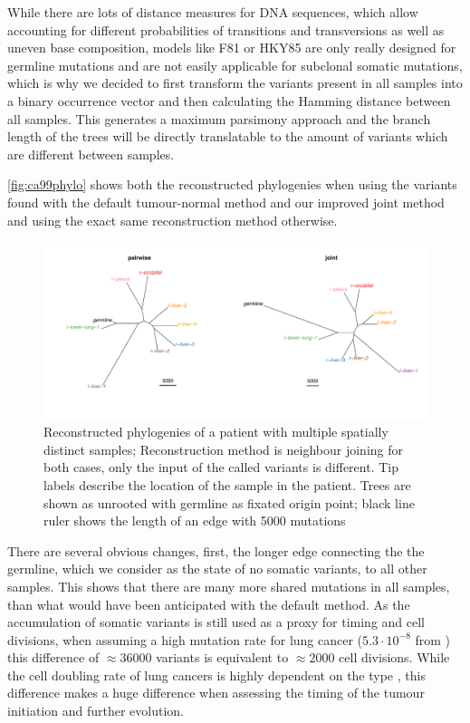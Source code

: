 While there are lots of distance measures for DNA sequences, which allow accounting for different probabilities of transitions and transversions as well as uneven base composition, models like F81 \cite{Felsenstein1981} or HKY85 \cite{Hasegawa1985} are only really designed for germline mutations and are not easily applicable for subclonal somatic mutations, which is why we decided to first transform the variants present in all samples into a binary occurrence vector and then calculating the Hamming distance \cite{Hamming1950} between all samples. This generates a maximum parsimony approach and the branch length of the trees will be directly translatable to the amount of variants which are different between samples. 

\autoref{fig:ca99phylo} shows both the reconstructed phylogenies when using the variants found with the default tumour-normal method and our improved joint method and using the exact same reconstruction method otherwise.

\begin{figure}[!ht]
\centering
\includegraphics[width=.99\linewidth]{Figures/phyloCA99.pdf}
\caption[Reconstructed phylogenies of joint samples]{Reconstructed phylogenies of a patient with multiple spatially distinct samples; Reconstruction method is neighbour joining for both cases, only the input of the called variants is different. Tip labels describe the location of the sample in the patient. Trees are shown as unrooted with germline as fixated origin point; black line ruler shows the length of an edge with 5000 mutations}\label{fig:ca99phylo}
\end{figure}

There are several obvious changes, first, the longer edge connecting the the germline, which we consider as the state of no somatic variants, to all other samples. This shows that there are many more shared mutations in all samples, than what would have been anticipated with the default method. As the accumulation of somatic variants is still used as a proxy for timing and cell divisions, when assuming a high mutation rate for lung cancer ($5.3 \cdot 10^{-8}$ from \citeauthor*{Werner2020} \cite{Werner2020}) this difference of $\approx 36000$ variants is equivalent to $\approx 2000$ cell divisions. While the cell doubling rate of lung cancers is highly dependent on the type \cite{Arai1994}, this difference makes a huge difference when assessing the timing of the tumour initiation and further evolution. 

